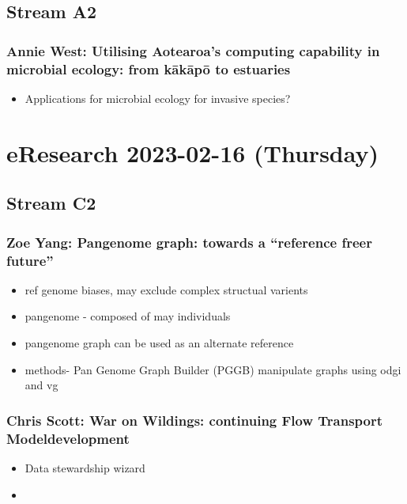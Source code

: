 \documentclass[document.tex]{subfiles}
\begin{document}
    \section*{Stream A2}
    \subsection{Annie West: Utilising Aotearoa’s computing capability in microbial ecology: from kākāpō to estuaries}
    \begin{itemize}
        \item Applications for microbial ecology for invasive species? 
        \end{itemize}


\chapter{eResearch 2023-02-16 (Thursday)}
\label{day:2023-02-15}
\section*{Stream C2}
\subsection{Zoe Yang: Pangenome graph: towards a “reference freer future”}
\begin{itemize}
    \item ref genome biases, may exclude complex structual varients
    \item pangenome - composed of may individuals
    \item pangenome graph can be used as an alternate reference 
    \item methods- Pan Genome Graph Builder (PGGB) manipulate graphs using odgi and vg
    \end{itemize}

    \subsection{Chris Scott: War on Wildings: continuing Flow Transport Modeldevelopment}
\begin{itemize}
    \item  Data stewardship wizard
    \item 
   
    \end{itemize}
\end{document}
